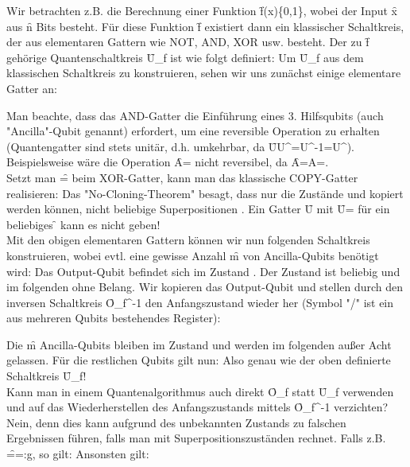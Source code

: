 Wir betrachten z.B. die Berechnung einer Funktion \f{f(x)\in\left\{0,1\right\}}, wobei der Input \f{x} aus \f{n} Bits besteht. Für diese Funktion \f{f} existiert dann ein klassischer Schaltkreis, der aus elementaren Gattern wie NOT, AND, XOR usw. besteht. Der zu \f{f} gehörige Quantenschaltkreis \f{U_f} ist wie folgt definiert:
Um \f{U_f} aus dem klassischen Schaltkreis zu konstruieren, sehen wir uns zunächst einige elementare Gatter an:

Man beachte, dass das AND-Gatter die Einführung eines 3. Hilfsqubits (auch "Ancilla"-Qubit genannt) erfordert, um eine reversible Operation zu erhalten (Quantengatter sind stets unitär, d.h. umkehrbar, da \f{UU^\dagger=\Rightarrow U^{-1}=U^\dagger}). Beispielsweise wäre die Operation \f{A=} nicht reversibel, da \f{A=A=}.\\
Setzt man \f{=} beim XOR-Gatter, kann man das klassische COPY-Gatter realisieren: 
Das "No-Cloning-Theorem" besagt, dass nur die Zustände  und  kopiert werden können, nicht beliebige Superpositionen \ket{\psi}. Ein Gatter \f{U} mit \f{U=\cket{\psi,\psi}} für ein beliebiges \f{\cket{\psi}} kann es nicht geben!\\
Mit den obigen elementaren Gattern können wir nun folgenden Schaltkreis konstruieren, wobei evtl. eine gewisse Anzahl \f{m} von Ancilla-Qubits benötigt wird:
Das Output-Qubit befindet sich im Zustand . Der Zustand  ist beliebig und im folgenden ohne Belang. Wir kopieren das Output-Qubit und stellen durch den inversen Schaltkreis \f{O_f^{-1}} den Anfangszustand wieder her (Symbol "/" ist ein aus mehreren Qubits bestehendes Register):

Die \f{m} Ancilla-Qubits bleiben im Zustand  und werden im folgenden außer Acht gelassen. Für die restlichen Qubits gilt nun:
Also genau wie der oben definierte Schaltkreis \f{U_f}!\\[1em]

Kann man in einem Quantenalgorithmus auch direkt \f{O_f} statt \f{U_f} verwenden und auf das Wiederherstellen des Anfangszustands mittels \f{O_f^{-1}} verzichten? Nein, denn 
dies kann aufgrund des unbekannten Zustands  zu falschen Ergebnissen führen, falls man mit Superpositionszuständen rechnet. Falls z.B. \f{==:g}, so gilt:
Ansonsten gilt:


